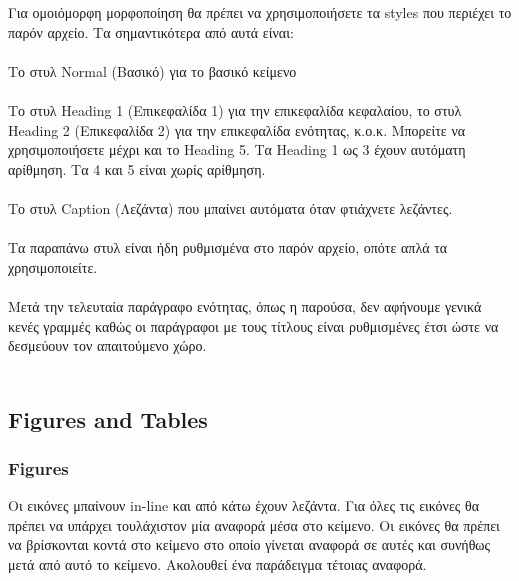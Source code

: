 \begin{flushleft}
    Για ομοιόμορφη μορφοποίηση θα πρέπει να χρησιμοποιήσετε τα styles που περιέχει το παρόν αρχείο. Τα σημαντικότερα από αυτά είναι: \\~\\

    Το στυλ Normal (Βασικό) για το βασικό κείμενο \\~\\
    
    Το στυλ Heading 1 (Επικεφαλίδα 1) για την επικεφαλίδα κεφαλαίου, το στυλ Heading 2 (Επικεφαλίδα 2) για την επικεφαλίδα ενότητας, κ.ο.κ. Μπορείτε να χρησιμοποιήσετε μέχρι και το Heading 5. Τα Heading 1 ως 3 έχουν αυτόματη αρίθμηση. Τα 4 και 5 είναι χωρίς αρίθμηση. \\~\\
    
    Το στυλ Caption (Λεζάντα) που μπαίνει αυτόματα όταν φτιάχνετε λεζάντες. \\~\\
    
    Τα παραπάνω στυλ είναι ήδη ρυθμισμένα στο παρόν αρχείο, οπότε απλά τα χρησιμοποιείτε.  \\~\\
    
    Μετά την τελευταία παράγραφο ενότητας, όπως η παρούσα, δεν αφήνουμε γενικά κενές γραμμές καθώς οι παράγραφοι με τους τίτλους είναι ρυθμισμένες έτσι ώστε να δεσμεύουν τον απαιτούμενο χώρο.  \\~\\
\end{flushleft}

\subsection{Figures and Tables}

\subsubsection{Figures}

\begin{flushleft}
    Οι εικόνες μπαίνουν in-line και από κάτω έχουν λεζάντα. Για όλες τις εικόνες θα πρέπει να υπάρχει τουλάχιστον μία αναφορά μέσα στο κείμενο. Οι εικόνες θα πρέπει να βρίσκονται κοντά στο κείμενο στο οποίο γίνεται αναφορά σε αυτές και συνήθως μετά από αυτό το κείμενο. Ακολουθεί ένα παράδειγμα τέτοιας αναφορά. \\~\\
\end{flushleft}

